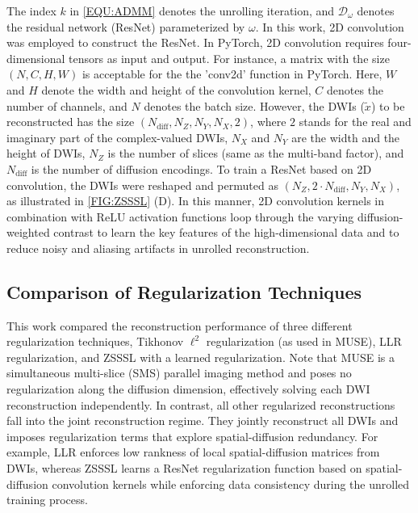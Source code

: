 \documentclass[journal,twoside,web]{ieeecolor}
\begin{document}
	The index $k$ in \cref{EQU:ADMM} denotes the unrolling iteration,
	and $\mathcal{D}_{\omega}$ denotes the residual network (ResNet) \cite{he_2016_resnet}
	parameterized by $\omega$.
	In this work, 2D convolution was employed to construct the ResNet.
	In PyTorch, 2D convolution requires four-dimensional tensors as input and output.
	For instance, a matrix with the size $(N, C, H, W)$ is acceptable
	for the the 'conv2d' function in PyTorch.
	Here, $W$ and $H$ denote the width and height of the convolution kernel,
	$C$ denotes the number of channels, and $N$ denotes the batch size.
	However, the DWIs ($\tilde{x}$) to be reconstructed
	has the size $(N_{\text{diff}}, N_Z, N_Y, N_X, 2)$,
	where $2$ stands for the real and imaginary part of the complex-valued DWIs,
	$N_X$ and $N_Y$ are the width and the height of DWIs,
	$N_Z$ is the number of slices (same as the multi-band factor), and
	$N_{\text{diff}}$ is the number of diffusion encodings.
	To train a ResNet based on 2D convolution, the DWIs were reshaped and permuted
	as $(N_Z, 2 \cdot N_{\text{diff}}, N_Y, N_X)$, as illustrated in \cref{FIG:ZSSSL} (D).
	In this manner, 2D convolution kernels in combination with ReLU activation functions
	loop through the varying diffusion-weighted contrast
	to learn the key features of the high-dimensional data and
	to reduce noisy and aliasing artifacts in unrolled reconstruction.

	\subsection{Comparison of Regularization Techniques}

	This work compared the reconstruction performance
	of three different regularization techniques,
	Tikhonov $\ell^2$ regularization (as used in MUSE),
	LLR regularization,
	and ZSSSL with a learned regularization.
	Note that MUSE is a simultaneous multi-slice (SMS) parallel imaging method
	and poses no regularization along the diffusion dimension,
	effectively solving each DWI reconstruction independently.
	In contrast, all other regularized reconstructions
	fall into the joint reconstruction regime.
	They jointly reconstruct all DWIs
	and imposes regularization terms that explore spatial-diffusion redundancy.
	For example, LLR enforces low rankness of
	local spatial-diffusion matrices from DWIs,
	whereas ZSSSL learns a ResNet regularization function
	based on spatial-diffusion convolution kernels
	while enforcing data consistency during the unrolled training process.
\end{document}
